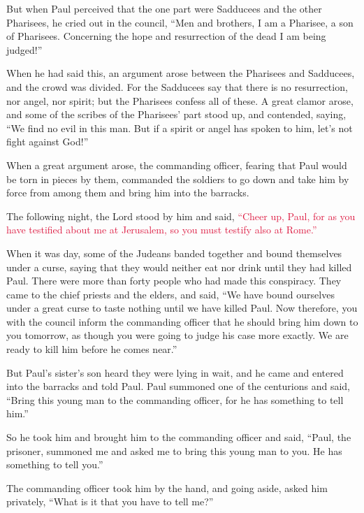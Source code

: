 \myverse{}But when Paul perceived that the one part were Sadducees and the
other Pharisees, he cried out in the council, “Men and brothers, I am a Pharisee, a son of Pharisees.
Concerning the hope and resurrection of the dead I am being judged!”

\myverse{}When he had said this, an argument arose between the Pharisees
and Sadducees, and the crowd was divided.
\myverse{}For the Sadducees say that there is no resurrection, nor angel, nor spirit;
but the Pharisees confess all of these.
\myverse{}A great clamor arose, and some of the scribes of the Pharisees’ part stood
up, and contended, saying, “We find no evil in this man. But if a spirit or angel has spoken to him, let’s
not fight against God!”

\myverse{}When a great argument arose, the commanding officer, fearing
that Paul would be torn in pieces by them, commanded the soldiers to go down and take him by force from
among them and bring him into the barracks.

\myverse{}The following night, the Lord stood by him and said,
\textcolor{crimson}{“Cheer up, Paul, for as you have testified about me at Jerusalem, so you must testify also at Rome.”}

\myverse{}When it was day, some of the Judeans banded together and bound
themselves under a curse, saying that they would neither eat nor drink until they had killed Paul.
\myverse{}There were more than forty people who had made this conspiracy.
\myverse{}They came to the chief priests and the elders, and said, “We have bound ourselves
under a great curse to taste nothing until we have killed Paul.
\myverse{}Now therefore, you with the council inform the commanding officer that he
should bring him down to you tomorrow, as though you were going to judge his case more exactly. We are
ready to kill him before he comes near.”

\myverse{}But Paul’s sister’s son heard they were lying in wait, and he
came and entered into the barracks and told Paul.
\myverse{}Paul summoned one of the centurions and said, “Bring this young man to the
commanding officer, for he has something to tell him.”

\myverse{}So he took him and brought him to the commanding officer and
said, “Paul, the prisoner, summoned me and asked me to bring this young man to you. He has something to
tell you.”

\myverse{}The commanding officer took him by the hand, and going aside,
asked him privately, “What is it that you have to tell me?”

